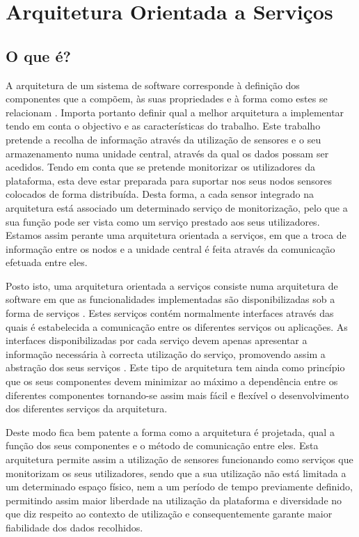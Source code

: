 \chapter{Arquitetura Orientada a Serviços}

\section{O que é?}
A arquitetura de um sistema de software corresponde à definição dos componentes que a compõem, às suas propriedades e à forma como estes se relacionam \cite{bosch2004software}. Importa portanto definir qual a melhor arquitetura a implementar tendo em conta o objectivo e as características do trabalho. Este trabalho pretende a recolha de informação através da utilização de sensores e o seu armazenamento numa unidade central, através da qual os dados possam ser acedidos. Tendo em conta que se pretende monitorizar os utilizadores da plataforma, esta deve estar preparada para suportar nos seus nodos sensores colocados de forma distribuída. Desta forma, a cada sensor integrado na arquitetura está associado um determinado serviço de monitorização, pelo que a sua função pode ser vista como um serviço prestado aos seus utilizadores. Estamos assim perante uma arquitetura orientada a serviços, em que a troca de informação entre os nodos e a unidade central é feita através da comunicação efetuada entre eles.

Posto isto, uma arquitetura orientada a serviços consiste numa arquitetura de software em que as funcionalidades implementadas são disponibilizadas sob a forma de serviços \cite{he2003service, papazoglou2003service}. Estes serviços contém normalmente interfaces através das quais é estabelecida a comunicação entre os diferentes serviços ou aplicações. As interfaces disponibilizadas por cada serviço devem apenas apresentar a informação necessária à correcta utilização do serviço, promovendo assim a abstração dos seus serviços \cite{erl2004service, krafzig2005enterprise}. Este tipo de arquitetura tem ainda como princípio que os seus componentes devem minimizar ao máximo a dependência entre os diferentes componentes \cite{erl2004service, krafzig2005enterprise} tornando-se assim mais fácil e flexível o desenvolvimento dos diferentes serviços da arquitetura.

Deste modo fica bem patente a forma como a arquitetura é projetada, qual a função dos seus componentes e o método de comunicação entre eles. Esta arquitetura permite assim a utilização de sensores funcionando como serviços que monitorizam os seus utilizadores, sendo que a sua utilização não está limitada a um determinado espaço físico, nem a um período de tempo previamente definido, permitindo assim maior liberdade na utilização da plataforma e diversidade no que diz respeito ao contexto de utilização e consequentemente garante maior fiabilidade dos dados recolhidos.


